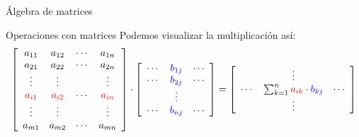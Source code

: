 \begin{chapter}{\'Algebra de matrices}
\begin{section}{Operaciones con matrices}
                Podemos visualizar la multiplicación así:
                \begin{align*}
                    \left[
                    \begin{array}{cccc}
                        a_{11} & a_{12} & \cdots & a_{1n}\\ 
                        a_{21} & a_{22} & \cdots & a_{2n}\\
                        \vdots & \vdots & & \vdots\\
                        \textcolor{red}{a_{i1}} & \textcolor{red}{a_{i2}} & \cdots & \textcolor{red}{a_{in}}\\  
                        \vdots & \vdots & & \vdots\\
                        a_{m1} & a_{m2} & \cdots & a_{mn}
                    \end{array}
                    \right] 
                    \cdot
                    \left[
                    \begin{array}{ccc}
                        \cdots & \textcolor{blue}{b_{1j}} & \cdots\\ 
                        \cdots & \textcolor{blue}{b_{2j}} & \cdots\\
                        & \textcolor{blue}{\vdots} & \\
                        \cdots & \textcolor{blue}{b_{nj}} & \cdots 
                    \end{array}
                    \right]
                    =
                    \left[
                    \begin{array}{ccc}
                        &\vdots&\\
                        \cdots&\sum_{k=1}^n\textcolor{red}{a_{ik}}\cdot
                        \textcolor{blue}{b_{kj}}&\cdots\\
                        &\vdots&
                    \end{array}
                    \right]
                \end{align*} 


\end{section}
\end{chapter}
